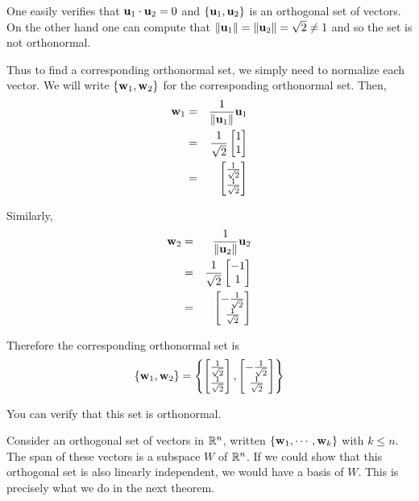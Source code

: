 \documentclass{ximera}
\begin{document}
\begin{explanation}
One easily verifies that ${\bf u}_1 \cdot {\bf u}_2 = 0$ and
$\left\{ {\bf u}_1, {\bf u}_2 \right\}$ is an orthogonal set of
vectors. On the other hand one can compute that ${\left\lVert{\bf u}_1\right\rVert}= {\left\lVert{\bf u}_2\right\rVert} =
\sqrt{2} \neq 1$ and so the set is not orthonormal.

Thus to find a corresponding orthonormal set, we simply need to
normalize each vector. We will write $\{ {\bf w}_1, {\bf w}_2 \}$
for the corresponding orthonormal set. Then,
\begin{eqnarray*}
{\bf w}_1 &=& \frac{1}{\left\lVert{\bf u}_1\right\rVert}{\bf u}_1\\
&=& \frac{1}{\sqrt{2}} \begin{bmatrix}
1 \\
1
\end{bmatrix} \\
&=&
\begin{bmatrix}
\frac{1}{\sqrt{2}} \\
\frac{1}{\sqrt{2}}
\end{bmatrix}
\end{eqnarray*}

Similarly,
\begin{eqnarray*}
{\bf w}_2 &=& \frac{1}{\left\lVert{\bf u}_2\right\rVert}{\bf u}_2\\
&=& \frac{1}{\sqrt{2}} \begin{bmatrix}
-1 \\
1
\end{bmatrix} \\
&=&
\begin{bmatrix}
-\frac{1}{\sqrt{2}} \\
\frac{1}{\sqrt{2}}
\end{bmatrix}
\end{eqnarray*}

Therefore the corresponding orthonormal set is
\[
\left\{ {\bf w}_1, {\bf w}_2 \right\} =
\left\{
\begin{bmatrix}
\frac{1}{\sqrt{2}} \\
\frac{1}{\sqrt{2}}
\end{bmatrix},
\begin{bmatrix}
-\frac{1}{\sqrt{2}} \\
\frac{1}{\sqrt{2}}
\end{bmatrix}
\right\}
\]

You can verify that this set is orthonormal.
\end{explanation}

Consider an orthogonal set of vectors in $\mathbb{R}^n$, written $\{
{\bf w}_1, \cdots, {\bf w}_k \}$ with $k \leq n$. The span of these
vectors is a subspace $W$ of $\mathbb{R}^n$. If we
could show that this orthogonal set is also linearly independent, we
would have a basis of $W$. This is precisely what we do in the next theorem.
\end{document}
